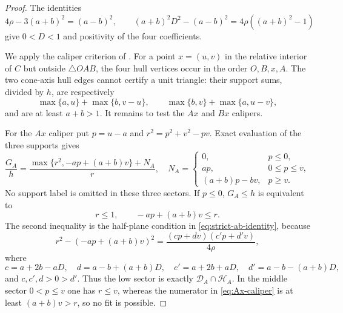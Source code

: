 \begin{proof}
The identities
\[
 4\rho-3(a+b)^2=(a-b)^2,
 \qquad
 (a+b)^2D^2-(a-b)^2=4\rho((a+b)^2-1)
\]
give $0<D<1$ and positivity of the four coefficients.

We apply the caliper criterion of .  For a
point $x=(u,v)$ in the relative interior of $C$ but outside
$\triangle OAB$, the four hull vertices occur in the order $O,B,x,A$.
The two cone-axis hull edges cannot certify a unit triangle: their support
sums, divided by $h$, are respectively
\[
 \max\{a,u\}+\max\{b,v-u\},\qquad
 \max\{b,v\}+\max\{a,u-v\},
\]
and are at least $a+b>1$.  It remains to test the $Ax$ and $Bx$ calipers.

For the $Ax$ caliper put $p=u-a$ and
$r^2=p^2+v^2-pv$.  Exact evaluation of the three supports gives
\begin{equation}
 \frac{G_A}{h}=
 \frac{\max\{r^2,-ap+(a+b)v\}+N_A}{r},
 \quad
 N_A=\begin{cases}
 0,&p\le0,\\
 ap,&0\le p\le v,\\
 (a+b)p-bv,&p\ge v.
 \end{cases}                                      \label{eq:Ax-caliper}
\end{equation}
No support label is omitted in these three sectors.  If $p\le0$,
$G_A\le h$ is equivalent to
\[
 r\le1,\qquad -ap+(a+b)v\le r.
\]
The second inequality is the half-plane condition in
\eqref{eq:strict-ab-identity}, because
\[
 r^2-(-ap+(a+b)v)^2
 =\frac{(cp+dv)(c'p+d'v)}{4\rho},
\]
where
\[
 c=a+2b-aD,\quad d=a-b+(a+b)D,
 \quad c'=a+2b+aD,\quad d'=a-b-(a+b)D,
\]
and $c,c',d>0>d'$.  Thus the low sector is exactly
$\mathcal D_A\cap\mathcal H_A$.  In the middle sector $0<p\le v$ one has
$r\le v$, whereas the numerator in \eqref{eq:Ax-caliper} is at least
$(a+b)v>r$, so no fit is possible.


\end{proof}
